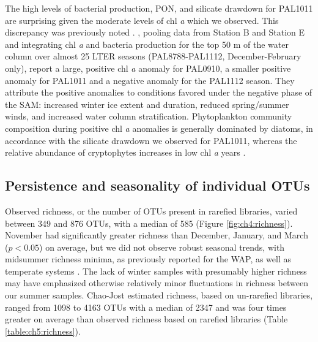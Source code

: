 The high levels of bacterial production, PON, and silicate drawdown for PAL1011 are surprising given the moderate levels of chl \emph{a} which we observed. This discrepancy was previously noted \citep{kim2016decedal}. \citet{saba2014winter}, pooling data from Station B and Station E and integrating chl \emph{a} and bacteria production for the top 50 m of the water column over almost 25 LTER seasons (PAL8788-PAL1112, December-February only), report a large, positive chl \emph{a} anomaly for PAL0910, a smaller positive anomaly for PAL1011 and a negative anomaly for the PAL1112 season. They attribute the positive anomalies to conditions favored under the negative phase of the SAM: increased winter ice extent and duration, reduced spring/summer winds, and increased water column stratification. Phytoplankton community composition during positive chl \emph{a} anomalies is generally dominated by diatoms, in accordance with the silicate drawdown we observed for PAL1011, whereas the relative abundance of cryptophytes increases in low chl \emph{a} years \citep{saba2014winter}.

\subsection{Persistence and seasonality of individual OTUs} 

Observed richness, or the number of OTUs present in rarefied libraries, varied between 349 and 876 OTUs, with a median of 585 (Figure \ref{fig:ch4:richness}). November had significantly greater richness than December, January, and March ($p < 0.05$) on average, but we did not observe robust seasonal trends, with midsummer richness minima, as previously reported for the WAP, as well as temperate systems \citep{luria2016seasonal,Ladau2013-ro,Gilbert2012-ta}. The lack of winter samples with presumably higher richness may have emphasized otherwise relatively minor fluctuations in richness between our summer samples. Chao-Jost estimated richness, based on un-rarefied libraries, ranged from 1098 to 4163 OTUs with a median of 2347 and was four times greater on average than observed richness based on rarefied libraries (Table \ref{table:ch5:richness}).



